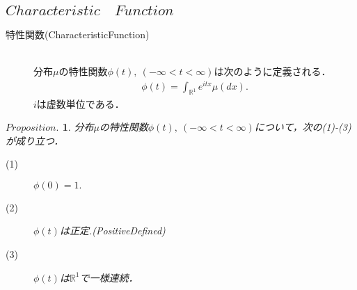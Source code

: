 \documentclass[a4j,papersize,disablejfam,slide,14pt]{jsarticle}
\newtheorem{Prop}{$Proposition.$}
\def\exp#1{e^{#1}} %
\begin{document}
\subsection{$Characteristic\quad Function$}
    \begin{screen}
    	\begin{description}
        	\item[特性関数({\rm Characteristic\quad Function})]\mbox{}\\
            	分布$\mu$の特性関数$\phi(t),\ (-\infty < t < \infty)$は次のように定義される．
                \begin{align}
            		\phi(t) = \int_{\mathbb{R}^1} \exp{itx} \mu(dx).
                \end{align}
                $i$は虚数単位である．
        \end{description}
    \end{screen}
    \begin{screen}
    	\begin{Prop}
        	分布$\mu$の特性関数$\phi(t),\ (-\infty < t < \infty)$について，次の(1)-(3)が成り立つ．
            \begin{description}
            	\item[(1)] $\phi(0) = 1.$
            	\item[(2)] $\phi(t)$は正定.({\rm Positive\quad Defined})
            	\item[(3)] $\phi(t)$は$\mathbb{R}^1$で一様連続．
            \end{description}
        \end{Prop}
    \end{screen}
\end{document}
